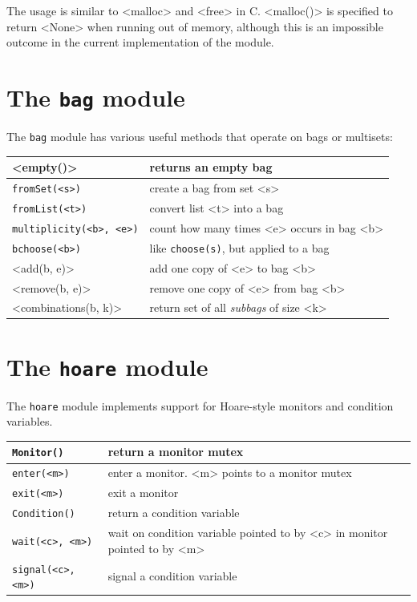\documentclass{report}
\begin{document}
The usage is similar to <{malloc}> and <{free}> in C.
<{malloc()}> is specified to return <{None}> when running out of
memory, although this is an impossible outcome in the current
implementation of the module.

\section{The \texttt{bag} module}
\label{ap:bag}

The \texttt{bag} module
%
has various useful methods that operate on bags or
multisets:

\vspace{1em}
\begin{tabular}{|l|l|}
\hline
<{empty()}> & returns an empty bag\\
\hline
\texttt{fromSet(<{s}>)} & create a bag from set <{s}>\\
\hline
\texttt{fromList(<{t}>)} & convert list <{t}> into a bag \\
\hline
\texttt{multiplicity(<{b}>, <{e}>)} & count how many times <{e}> occurs in bag <{b}>\\
\hline
\texttt{bchoose(<{b}>)} & like \texttt{choose(s)}, but applied to a bag\\
\hline
<{add(b, e)}> & add one copy of <{e}> to bag <{b}> \\
\hline
<{remove(b, e)}> & remove one copy of <{e}> from bag <{b}> \\
\hline
<{combinations(b, k)}> & return set of all \emph{subbags} of size <{k}> \\
\hline
\end{tabular}

\section{The \texttt{hoare} module}
\label{ap:hoare}

%
The \texttt{hoare} module implements support for Hoare-style monitors
and condition variables.

\vspace{1em}
\begin{tabular}{|l|l|}
\hline
\texttt{Monitor()} & return a monitor mutex\\
\hline
\texttt{enter(<{m}>)} & enter a monitor.  <{m}> points to a monitor mutex\\
\hline
\texttt{exit(<{m}>)} & exit a monitor\\
\hline
\texttt{Condition()} & return a condition variable\\
\hline
\texttt{wait(<{c}>, <{m}>)} & wait on condition variable pointed to by <{c}> in monitor pointed to by <{m}>\\
\hline
\texttt{signal(<{c}>, <{m}>)} & signal a condition variable\\
\hline
\end{tabular}
\end{document}

